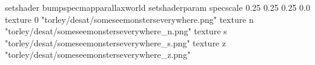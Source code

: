 setshader bumpspecmapparallaxworld
setshaderparam specscale 0.25 0.25 0.25 0.0
texture 0 "torley/desat/someseemonsterseverywhere.png"
texture n "torley/desat/someseemonsterseverywhere_n.png"
texture s "torley/desat/someseemonsterseverywhere_s.png"
texture z "torley/desat/someseemonsterseverywhere_z.png"

